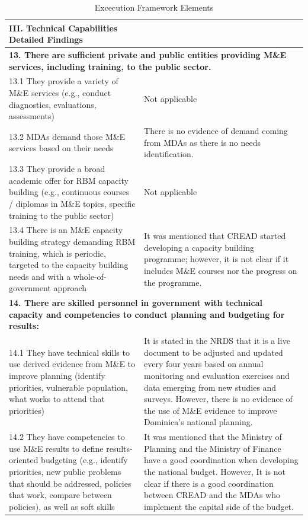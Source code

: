 \documentclass[
  10pt,
]{book}
\begin{document}
\begin{table}

\caption{\label{tab:unnamed-chunk-2}Excecution Framework Elements}
\centering
\begin{tabular}[t]{l|l}
\hline
III. Technical Capabilities Detailed Findings &  \\
\hline
\multicolumn{2}{l}{\textbf{13. There are sufficient private and public entities providing M\&E services, including training, to the public sector.}}\\
\hline
\hspace{1em}13.1 They provide a variety of M\&E services (e.g., conduct diagnostics, evaluations, assessments) & Not applicable\\
\hline
\hspace{1em}13.2 MDAs demand those M\&E services based on their needs & There is no evidence of demand coming from MDAs as there is no needs identification.\\
\hline
\hspace{1em}13.3 They provide a broad academic offer for RBM capacity building (e.g., continuous courses / diplomas in M\&E topics, specific training to the public sector) & Not applicable\\
\hline
\hspace{1em}13.4 There is an M\&E capacity building strategy demanding RBM training, which is periodic, targeted to the capacity building needs and with a whole-of-government approach & It was mentioned that CREAD started developing a capacity building programme; however, it is not clear if it includes M\&E courses nor the progress on the programme.\\
\hline
\multicolumn{2}{l}{\textbf{14. There are skilled personnel in government with technical capacity and competencies to conduct planning and budgeting for results:}}\\
\hline
\hspace{1em}14.1 They have technical skills to use derived evidence from M\&E to improve planning (identify priorities, vulnerable population, what works to attend that priorities) & It is stated in the NRDS that it is a live document to be adjusted and updated every four years based on annual monitoring and evaluation exercises and data emerging from new studies and surveys. However, there is no evidence of the use of M\&E evidence to improve Dominica’s national planning.\\
\hline
\hspace{1em}14.2 They have competencies to use M\&E results to define results-oriented budgeting (e.g., identify priorities, new public problems that should be addressed, policies that work, compare between policies), as well as soft skills & It was mentioned that the Ministry of Planning and the Ministry of Finance have a good coordination when developing the national budget. However, It is not clear if there is a good coordination between CREAD and the MDAs who implement the capital side of the budget.\\

\end{tabular}
\end{table}
\end{document}
